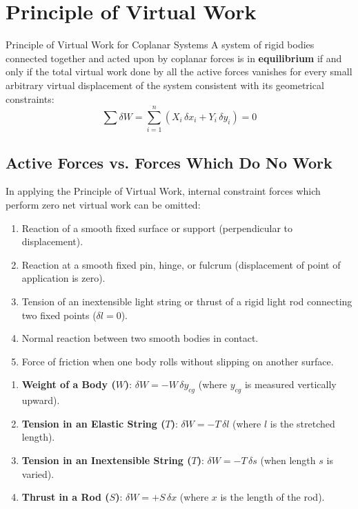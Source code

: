 \section{Principle of Virtual Work}

\begin{theorembox}{Principle of Virtual Work for Coplanar Systems}
A system of rigid bodies connected together and acted upon by coplanar forces is in \textbf{equilibrium} if and only if the total virtual work done by all the active forces vanishes for every small arbitrary virtual displacement of the system consistent with its geometrical constraints:
\begin{equation}
    \sum \delta W = \sum_{i=1}^n \left( X_i \, \delta x_i + Y_i \, \delta y_i \right) = 0
\end{equation}
\end{theorembox}

\subsection{Active Forces vs. Forces Which Do No Work}

In applying the Principle of Virtual Work, internal constraint forces which perform zero net virtual work can be omitted:

\begin{keybox}[Forces which Do NO Virtual Work ($\delta W = 0$)]
\begin{enumerate}[leftmargin=1.5em]
    \item Reaction of a smooth fixed surface or support (perpendicular to displacement).
    \item Reaction at a smooth fixed pin, hinge, or fulcrum (displacement of point of application is zero).
    \item Tension of an inextensible light string or thrust of a rigid light rod connecting two fixed points ($\delta l = 0$).
    \item Normal reaction between two smooth bodies in contact.
    \item Force of friction when one body rolls without slipping on another surface.
\end{enumerate}
\end{keybox}

\begin{keybox}
\begin{enumerate}[leftmargin=1.5em]
    \item \textbf{Weight of a Body ($W$)}: $\delta W = -W \, \delta y_{cg}$ (where $y_{cg}$ is measured vertically upward).
    \item \textbf{Tension in an Elastic String ($T$)}: $\delta W = -T \, \delta l$ (where $l$ is the stretched length).
    \item \textbf{Tension in an Inextensible String ($T$)}: $\delta W = -T \, \delta s$ (when length $s$ is varied).
    \item \textbf{Thrust in a Rod ($S$)}: $\delta W = +S \, \delta x$ (where $x$ is the length of the rod).
\end{enumerate}
\end{keybox}

